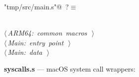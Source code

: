 \documentclass[11pt,a4paper,twoside,openright,DIV=15]{scrbook}
\theoremstyle{definition}
\theoremstyle{plain}
\theoremstyle{remark}
\begin{document}
\begin{flushleft} \small
\begin{minipage}{\linewidth}\label{scrap85}\raggedright\small
{} \verb@"tmp/src/main.s"@\nobreak\ {\footnotesize {?}}$\equiv$
\vspace{-1ex}
\begin{list}{}{} \item
\mbox{}\verb@@\\
\mbox{}\verb@@\hbox{$\langle\,${\itshape ARM64: common macros}\nobreak\ {\footnotesize {}}$\,\rangle$}\verb@@\\
\mbox{}\verb@@\hbox{$\langle\,${\itshape Main: entry point}\nobreak\ {\footnotesize {}}$\,\rangle$}\verb@@\\
\mbox{}\verb@@\hbox{$\langle\,${\itshape Main: data}\nobreak\ {\footnotesize {}}$\,\rangle$}\verb@@\\
\mbox{}\verb@@{\NWsep}
\end{list}
\vspace{-1.5ex}
\footnotesize
\begin{list}{}{\setlength{\itemsep}{-\parsep}\setlength{\itemindent}{-\leftmargin}}

\item{}
\end{list}
\end{minipage}\vspace{4ex}
\end{flushleft}
\noindent\textbf{syscalls.s} --- macOS system call wrappers:
\end{document}
